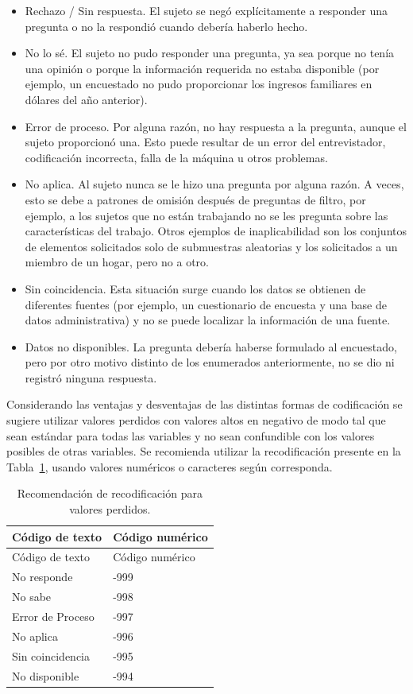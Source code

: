 \documentclass[
  spanish,
  letterpaper,
  DIV=11,
  numbers=noendperiod]{scrreprt}
\begin{document}
\begin{itemize}
\item
  Rechazo / Sin respuesta. El sujeto se negó explícitamente a responder
  una pregunta o no la respondió cuando debería haberlo hecho.
\item
  No lo sé. El sujeto no pudo responder una pregunta, ya sea porque no
  tenía una opinión o porque la información requerida no estaba
  disponible (por ejemplo, un encuestado no pudo proporcionar los
  ingresos familiares en dólares del año anterior).
\item
  Error de proceso. Por alguna razón, no hay respuesta a la pregunta,
  aunque el sujeto proporcionó una. Esto puede resultar de un error del
  entrevistador, codificación incorrecta, falla de la máquina u otros
  problemas.
\item
  No aplica. Al sujeto nunca se le hizo una pregunta por alguna razón. A
  veces, esto se debe a patrones de omisión después de preguntas de
  filtro, por ejemplo, a los sujetos que no están trabajando no se les
  pregunta sobre las características del trabajo. Otros ejemplos de
  inaplicabilidad son los conjuntos de elementos solicitados solo de
  submuestras aleatorias y los solicitados a un miembro de un hogar,
  pero no a otro.
\item
  Sin coincidencia. Esta situación surge cuando los datos se obtienen de
  diferentes fuentes (por ejemplo, un cuestionario de encuesta y una
  base de datos administrativa) y no se puede localizar la información
  de una fuente.
\item
  Datos no disponibles. La pregunta debería haberse formulado al
  encuestado, pero por otro motivo distinto de los enumerados
  anteriormente, no se dio ni registró ninguna respuesta.
\end{itemize}

Considerando las ventajas y desventajas de las distintas formas de
codificación se sugiere utilizar valores perdidos con valores altos en
negativo de modo tal que sean estándar para todas las variables y no
sean confundible con los valores posibles de otras variables. Se
recomienda utilizar la recodificación presente en la
Tabla~\ref{tbl-tabna}, usando valores numéricos o caracteres según
corresponda.

\begin{longtable}[]{@{}ll@{}}
\caption{Recomendación de recodificación para valores
perdidos.}\label{tbl-tabna}\tabularnewline
\toprule\noalign{}
Código de texto & Código numérico \\
\midrule\noalign{}
\endfirsthead
\toprule\noalign{}
Código de texto & Código numérico \\
\midrule\noalign{}
\endhead
\bottomrule\noalign{}
\endlastfoot
No responde & -999 \\
No sabe & -998 \\
Error de Proceso & -997 \\
No aplica & -996 \\
Sin coincidencia & -995 \\
No disponible & -994 \\
\end{longtable}
\end{document}
